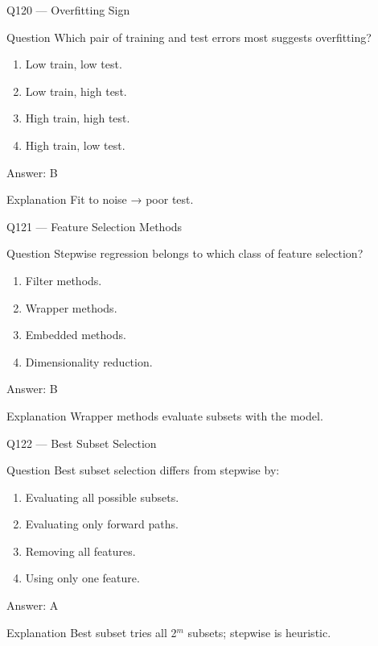 \documentclass[aspectratio=169,8pt]{beamer}
\begin{document}
\begin{frame}{Q120 --- Overfitting Sign}
\begin{block}{Question}
Which pair of training and test errors most suggests overfitting?
\end{block}
\begin{enumerate}
\item Low train, low test.
\item Low train, high test.
\item High train, high test.
\item High train, low test.
\end{enumerate}

\begin{exampleblock}{Answer: B}\end{exampleblock}
\begin{block}{Explanation}
Fit to noise → poor test.
\end{block}
\end{frame}

\begin{frame}{Q121 --- Feature Selection Methods}
\begin{block}{Question}
Stepwise regression belongs to which class of feature selection?
\end{block}
\begin{enumerate}
\item Filter methods.
\item Wrapper methods.
\item Embedded methods.
\item Dimensionality reduction.
\end{enumerate}

\begin{exampleblock}{Answer: B}\end{exampleblock}
\begin{block}{Explanation}
Wrapper methods evaluate subsets with the model.
\end{block}
\end{frame}

\begin{frame}{Q122 --- Best Subset Selection}
\begin{block}{Question}
Best subset selection differs from stepwise by:
\end{block}
\begin{enumerate}
\item Evaluating all possible subsets.
\item Evaluating only forward paths.
\item Removing all features.
\item Using only one feature.
\end{enumerate}

\begin{exampleblock}{Answer: A}\end{exampleblock}
\begin{block}{Explanation}
Best subset tries all 2$^m$ subsets; stepwise is heuristic.
\end{block}
\end{frame}
\end{document}
